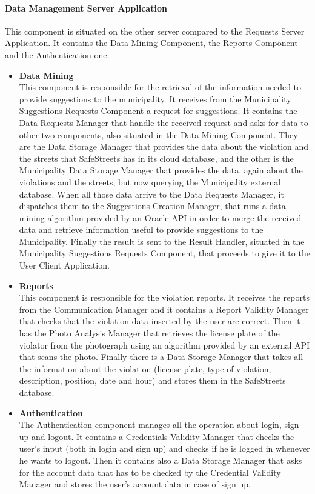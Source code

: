 \documentclass[titlepage]{article}
\begin{document}
\paragraph{Data Management Server Application}
This component is situated on the other server compared to the Requests Server Application. It contains the Data Mining Component, the Reports Component and the Authentication one:
\begin{itemize}
\item \textbf{Data Mining}\\
This component is responsible for the retrieval of the information needed to provide suggestions to the municipality. It receives from the Municipality Suggestions Requests Component a request for suggestions. It contains the Data Requests Manager that handle the received request and asks for data to other two components, also situated in the Data Mining Component. They are the Data Storage Manager that provides the data about the violation and the streets that SafeStreets has in its cloud database, and the other is the Municipality Data Storage Manager that provides the data, again about the violations and the streets, but now querying the Municipality external database. When all those data arrive to the Data Requests Manager, it dispatches them to the Suggestions Creation Manager, that runs a data mining algorithm provided by an Oracle API in order to merge the received data and retrieve information useful to provide suggestions to the Municipality. Finally the result is sent to the Result Handler, situated in the Municipality Suggestions Requests Component, that proceeds to give it to the User Client Application. 

\item \textbf{Reports}\\
This component is responsible for the violation reports. It receives the reports from the Communication Manager and it contains a Report Validity Manager that checks that the violation data inserted by the user are correct. Then it has the Photo Analysis Manager that retrieves the license plate of the violator from the photograph using an algorithm provided by an external API that scans the photo. Finally there is a Data Storage Manager that takes all the information about the violation (license plate, type of violation, description, position, date and hour) and stores them in the SafeStreets database.

\item \textbf{Authentication}\\
The Authentication component manages all the operation about login, sign up and logout.
It contains a Credentials Validity Manager that checks the user's input (both in login and sign up) and checks if he is logged in whenever he wants to logout. Then it contains also a Data Storage Manager that asks for the account data that has to be checked by the Credential Validity Manager and stores the user's account data in case of sign up.
\end{itemize}
\end{document}
